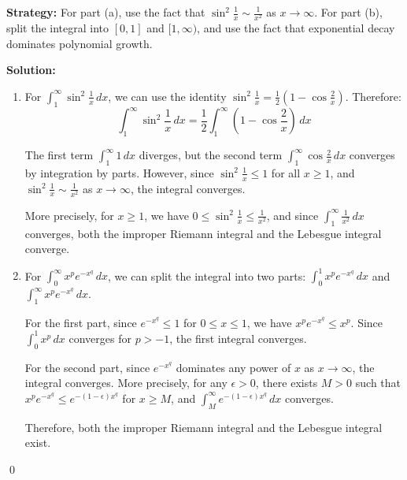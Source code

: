 \noindent\textbf{Strategy:} For part (a), use the fact that $\sin^2 \frac{1}{x} \sim \frac{1}{x^2}$ as $x \to \infty$. For part (b), split the integral into $[0,1]$ and $[1,\infty)$, and use the fact that exponential decay dominates polynomial growth.

\bigskip\noindent\textbf{Solution:}
\begin{enumerate}[label=(\alph*)]
\item For $\int_{1}^{\infty} \sin^2 \frac{1}{x} \, dx$, we can use the identity $\sin^2 \frac{1}{x} = \frac{1}{2}(1 - \cos \frac{2}{x})$. Therefore:
\[\int_{1}^{\infty} \sin^2 \frac{1}{x} \, dx = \frac{1}{2} \int_{1}^{\infty} \left(1 - \cos \frac{2}{x}\right) \, dx\]

The first term $\int_{1}^{\infty} 1 \, dx$ diverges, but the second term $\int_{1}^{\infty} \cos \frac{2}{x} \, dx$ converges by integration by parts. However, since $\sin^2 \frac{1}{x} \leq 1$ for all $x \geq 1$, and $\sin^2 \frac{1}{x} \sim \frac{1}{x^2}$ as $x \to \infty$, the integral converges.

More precisely, for $x \geq 1$, we have $0 \leq \sin^2 \frac{1}{x} \leq \frac{1}{x^2}$, and since $\int_{1}^{\infty} \frac{1}{x^2} \, dx$ converges, both the improper Riemann integral and the Lebesgue integral converge.

\item For $\int_{0}^{\infty} x^pe^{-x^q} \, dx$, we can split the integral into two parts: $\int_{0}^{1} x^pe^{-x^q} \, dx$ and $\int_{1}^{\infty} x^pe^{-x^q} \, dx$.

For the first part, since $e^{-x^q} \leq 1$ for $0 \leq x \leq 1$, we have $x^pe^{-x^q} \leq x^p$. Since $\int_{0}^{1} x^p \, dx$ converges for $p > -1$, the first integral converges.

For the second part, since $e^{-x^q}$ dominates any power of $x$ as $x \to \infty$, the integral converges. More precisely, for any $\epsilon > 0$, there exists $M > 0$ such that $x^pe^{-x^q} \leq e^{-(1-\epsilon)x^q}$ for $x \geq M$, and $\int_{M}^{\infty} e^{-(1-\epsilon)x^q} \, dx$ converges.

Therefore, both the improper Riemann integral and the Lebesgue integral exist.
\end{enumerate}\qed


